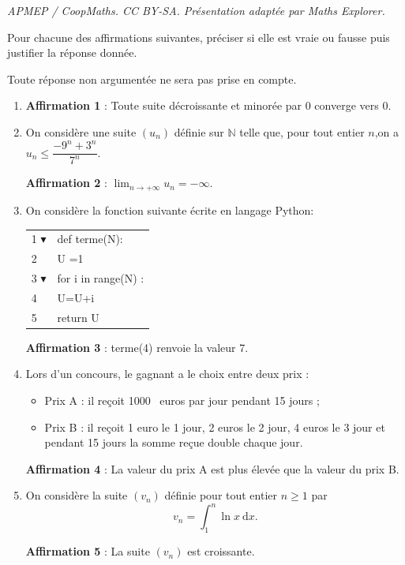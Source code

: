 \documentclass[10pt]{article}
\providecommand{\N}{\mathbb{N}}
\providecommand{\np}[2][]{{#2~#1}}
\begin{document}
\noindent\textit{APMEP / CoopMaths. CC BY-SA. Présentation adaptée par Maths Explorer.}\par\medskip
\medskip

Pour chacune des affirmations suivantes, préciser si elle est vraie ou fausse puis justifier
la réponse donnée.

Toute réponse non argumentée ne sera pas prise en compte.

\medskip

\begin{enumerate}
\item \textbf{Affirmation 1 }: Toute suite décroissante et minorée par 0 converge vers 0.
\item On considère une suite $\left(u_n\right)$ définie sur $\N$ telle que, pour tout entier $n$,on a \linebreak $u_n \leqslant  \dfrac{-9^n + 3^n}{7^n}$.

\textbf{Affirmation 2} : $\displaystyle\lim_{n \to + \infty} u_n =- \infty$.

\item On considère la fonction suivante écrite en langage Python:
\begin{center}
\begin{tabular}{l l}
1 {\tiny $\blacktriangledown$}& def terme(N):\\
2&\qquad  U =1\\
3 {\tiny $\blacktriangledown$}&\qquad for i in range(N) :\\
4&\qquad \qquad  U=U+i\\
5&\qquad  return U\\
\end{tabular}
\end{center}


\textbf{Affirmation 3} : terme(4) renvoie la valeur 7.
\item Lors d'un concours, le gagnant a le choix entre deux prix :

\begin{itemize}
\item Prix A : il reçoit \np{1000} euros par jour pendant 15 jours ;
\item Prix B : il reçoit 1 euro le 1 jour, 2 euros le 2 jour, 4 euros le 3 jour et pendant 15 jours la somme reçue double chaque jour.
\end{itemize}

\textbf{Affirmation 4 }: La valeur du prix A est plus élevée que la valeur du prix B.

\item On considère la suite $\left(v_n\right)$ définie pour tout entier $n \geqslant 1$ par
\[v_n = \displaystyle\int_1^n \ln x\:\text{d}x.\]

\textbf{Affirmation 5 }: La suite $\left(v_n\right)$ est croissante.
\end{enumerate}
\end{document}
